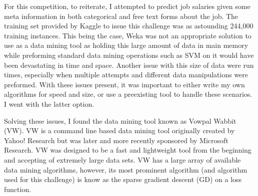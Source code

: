 \documentclass[conference]{IEEEtran}
\begin{document}
For this competition, to reiterate, I attempted to predict job salaries given
some meta information in both categorical and free text forms about the job.
The training set provided by Kaggle to issue this challenge was as astounding
244,000 training instances. This being the case, Weka was not an appropriate
solution to use as a data mining tool as holding this large amount of data in
main memory while preforming standard data mining operations such as SVM
on it would have been devastating in time and space. Another issue with this
size of data were run times, especially when multiple attempts and different data
manipulations were preformed. With these issues present, it was important 
to either write my own algorithms for speed and size, or use a preexisting
tool to handle these scenarios. I went with the latter option.

Solving these issues, I found the data mining tool known as Vowpal Wabbit
(VW). VW is a command line based data mining tool originally created by
Yahoo! Research but was later and more recently sponsored by Microsoft Research. 
VW was designed to be a fast and lightweight tool from the beginning
and accepting of extremely large data sets. VW has a large array of available
data mining algorithms, however, its most prominent algorithm (and algorithm
used for this challenge) is know as the sparse gradient descent (GD) on a loss
function.
\end{document}
